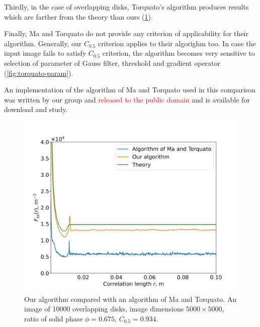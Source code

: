 \documentclass[reprint,amsmath,amssymb,aps,pre,showkeys,showpacs]{revtex4-1}
\begin{document}
Thirdly, in the case of overlapping disks, Torquato's algorithm produces results
which are farther from the theory than ours (\cref{fig:torquato}).

Finally, Ma and Torquato do not provide any criterion of applicability for their
algorithm. Generally, our $C_{0.5}$ criterion applies to their algorighm too. In
case the input image fails to satisfy $C_{0.5}$ criterion, the algorithm becomes
very sensitive to selection of parameter of Gauss filter, threshold and
gradient operator (\cref{fig:torquato-param}).

An implementation\cite{torquato-functions} of the algorithm of Ma and Torquato
used in this comparison was written by our group and \textcolor{red}{released to
  the public domain} and is available for download and study.

\begin{figure}
  \centering
  \includegraphics[width=\linewidth]{images/torquato-we.png}
  \caption[]{Our algorithm compared with an algorithm of Ma and Torquato. An
    image of 10000 overlapping disks, image dimensions $5000 \times 5000$, ratio
    of solid phase $\phi = 0.675$, $C_{0.5} = 0.934$.}
  \label{fig:torquato}
\end{figure}
\end{document}
